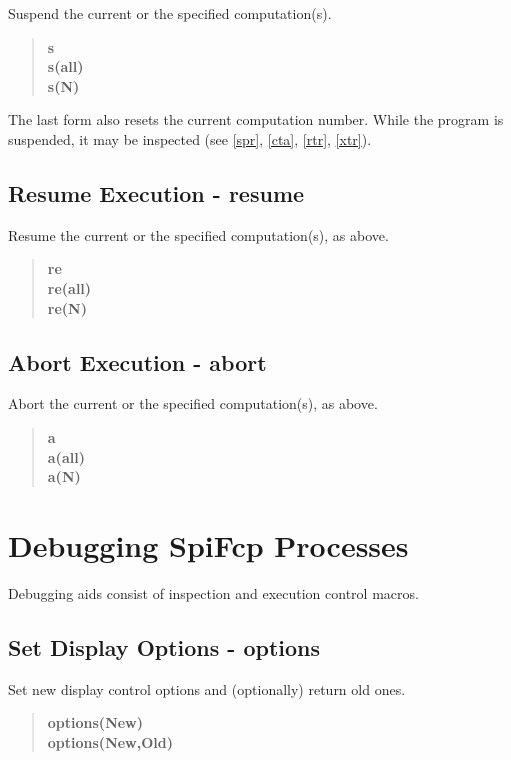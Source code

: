 \documentclass[twoside,10pt]{report}
\begin{document}
Suspend the current or the specified computation(s).

\begin{verse}
 {\bfseries
    s \\
    s(all) \\
    s(N)
 }
\end{verse}

\noindent
The last form also resets the current computation number.
While the program is suspended, it may be inspected (see
\ref{spr}, \ref{cta}, \ref{rtr}, \ref{xtr}).

\subsection{Resume Execution - resume}
\label{resume}
Resume the current or the specified computation(s), as above.

\begin{verse}
 {\bfseries
    re \\
    re(all) \\
    re(N)
 }
\end{verse}

\subsection{Abort Execution - abort}

Abort the current or the specified computation(s), as above.

\begin{verse}
 {\bfseries
    a \\
    a(all) \\
    a(N)
 }
\end{verse}


\section{Debugging SpiFcp Processes}

Debugging aids consist of inspection and execution control macros.

\subsection{Set Display Options - options}
\label{options}

Set new display control options and (optionally) return old ones.

\begin{verse}
 {\bfseries
    options(New) \\
    options(New,Old)
 }
\end{verse}
\end{document}
